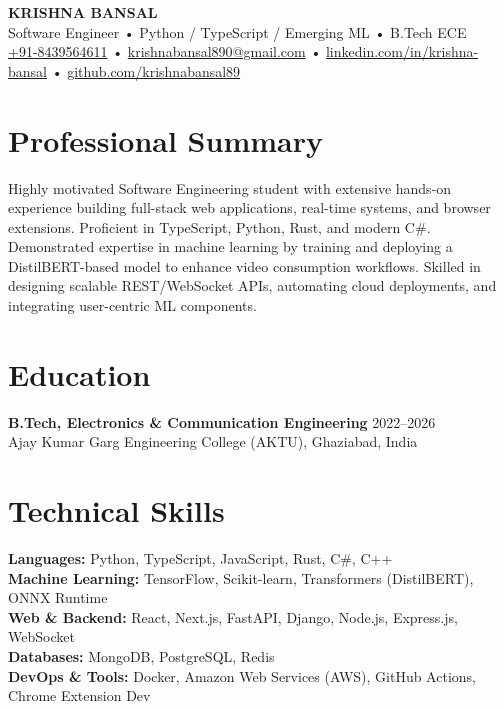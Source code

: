 \documentclass[letterpaper,10pt]{article}
\begin{document}
\begin{center}
    {\Huge\bfseries\color{primarycolor} KRISHNA BANSAL}\\[4pt]
    {\large Software Engineer • Python / TypeScript / Emerging ML • B.Tech ECE}\\[8pt]
    \small
    \faPhone* \href{tel:+918439564611}{+91-8439564611} \quad•\quad
    \faEnvelope \href{mailto:krishnabansal890@gmail.com}{krishnabansal890@gmail.com} \quad•\quad
    \faLinkedin \href{https://linkedin.com/in/krishna-bansal-a82a68254}{linkedin.com/in/krishna-bansal} \quad•\quad
    \faGithub \href{https://github.com/krishnabansal89}{github.com/krishnabansal89}
\end{center}

\section{Professional Summary}
Highly motivated Software Engineering student with extensive hands-on experience building full-stack web applications, real-time systems, and browser extensions. Proficient in TypeScript, Python, Rust, and modern C\#. Demonstrated expertise in machine learning by training and deploying a DistilBERT-based model to enhance video consumption workflows. Skilled in designing scalable REST/WebSocket APIs, automating cloud deployments, and integrating user-centric ML components.

\section{Education}
\textbf{B.Tech, Electronics \& Communication Engineering} \hfill 2022--2026\\
Ajay Kumar Garg Engineering College (AKTU), Ghaziabad, India

\section{Technical Skills}
\textbf{Languages:} Python, TypeScript, JavaScript, Rust, C\#, C++\\
\textbf{Machine Learning:} TensorFlow, Scikit-learn, Transformers (DistilBERT), ONNX Runtime\\
\textbf{Web \& Backend:} React, Next.js, FastAPI, Django, Node.js, Express.js, WebSocket\\
\textbf{Databases:} MongoDB, PostgreSQL, Redis\\
\textbf{DevOps \& Tools:} Docker, Amazon Web Services (AWS), GitHub Actions, Chrome Extension Dev
\end{document}
